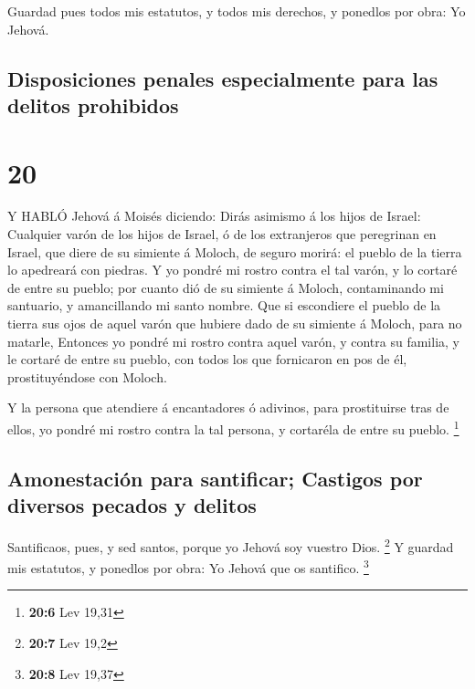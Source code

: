  Guardad pues todos mis estatutos, y todos mis derechos, y
ponedlos por obra: Yo Jehová.

\hypertarget{disposiciones-penales-especialmente-para-las-delitos-prohibidos}{%
\subsection{Disposiciones penales especialmente para las delitos
prohibidos}\label{disposiciones-penales-especialmente-para-las-delitos-prohibidos}}

\hypertarget{section-19}{%
\section{20}\label{section-19}}

 Y HABLÓ Jehová á Moisés diciendo:  Dirás
asimismo á los hijos de Israel: Cualquier varón de los hijos de Israel,
ó de los extranjeros que peregrinan en Israel, que diere de su simiente
á Moloch, de seguro morirá: el pueblo de la tierra lo apedreará con
piedras.  Y yo pondré mi rostro contra el tal varón, y lo
cortaré de entre su pueblo; por cuanto dió de su simiente á Moloch,
contaminando mi santuario, y amancillando mi santo nombre. 
Que si escondiere el pueblo de la tierra sus ojos de aquel varón que
hubiere dado de su simiente á Moloch, para no matarle, 
Entonces yo pondré mi rostro contra aquel varón, y contra su familia, y
le cortaré de entre su pueblo, con todos los que fornicaron en pos de
él, prostituyéndose con Moloch.

 Y la persona que atendiere á encantadores ó adivinos, para
prostituirse tras de ellos, yo pondré mi rostro contra la tal persona, y
cortaréla de entre su pueblo. \footnote{\textbf{20:6} Lev 19,31}

\hypertarget{amonestaciuxf3n-para-santificar-castigos-por-diversos-pecados-y-delitos}{%
\subsection{Amonestación para santificar; Castigos por diversos pecados
y
delitos}\label{amonestaciuxf3n-para-santificar-castigos-por-diversos-pecados-y-delitos}}

 Santificaos, pues, y sed santos, porque yo Jehová soy
vuestro Dios. \footnote{\textbf{20:7} Lev 19,2}  Y guardad
mis estatutos, y ponedlos por obra: Yo Jehová que os santifico.
\footnote{\textbf{20:8} Lev 19,37}

